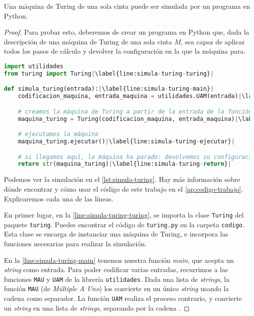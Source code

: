 \begin{proposicion}\label{prop:python-a-monocinta}
Una máquina de Turing de una sola cinta puede ser simulada por un programa en Python.
\end{proposicion}
\begin{proof}
Para probar esto, deberemos de crear un programa en Python que, dada la descripción de una máquina de Turing de una sola cinta $M$, sea capaz de aplicar todos los pasos de cálculo y devolver la configuración en la que la máquina para.
\vspace{8pt}
\begin{lstlisting}[language=Python, caption=\lstinline{simula_turing.py},label={lst:simula-turing}]
import utilidades
from turing import Turing|\label{line:simula-turing-turing}|

def simula_turing(entrada):|\label{line:simula-turing-main}|
    codificacion_maquina, entrada_maquina = utilidades.UAM(entrada)|\label{line:simula-turing-uam}|

    # creamos la máquina de Turing a partir de la entrada de la función SISO
    maquina_turing = Turing(codificacion_maquina, entrada_maquina)|\label{line:simula-turing-codificamaq}|

    # ejecutamos la máquina
    maquina_turing.ejecutar()|\label{line:simula-turing-ejecutar}|

    # si llegamos aquí, la máquina ha parado: devolvemos su configuración
    return str(maquina_turing)|\label{line:simula-turing-return}|
\end{lstlisting}

Podemos ver la simulación en el \cref{lst:simula-turing}. Hay más información sobre dónde encontrar y cómo usar el código de este trabajo en el \cref{ap:codigo-trabajo}. Explicaremos cada una de las líneas.

En primer lugar, en la \cref{line:simula-turing-turing}, se importa la clase \lstinline{Turing} del paquete \lstinline{turing}. Puedes encontrar el código de \texttt{turing.py} en la carpeta \texttt{codigo}. Esta clase se encarga de instanciar una máquina de Turing, e incorpora las funciones necesarias para realizar la simulación.

En la \cref{line:simula-turing-main} tenemos nuestra función \emph{main}, que acepta un \emph{string} como entrada. Para poder codificar varias entradas, recurrimos a las funciones \texttt{MAU} y \texttt{UAM} de la librería \texttt{utilidades}. Dada una lista de \emph{strings}, la función \texttt{MAU} (de \emph{Múltiple A Uno}) los convierte en un único \emph{string} usando la cadena \palabra{::} como separador. La función \texttt{UAM} realiza el proceso contrario, y convierte un \emph{string} en una lista de \emph{strings}, separando por la cadena \palabra{::}.


\end{proof}
